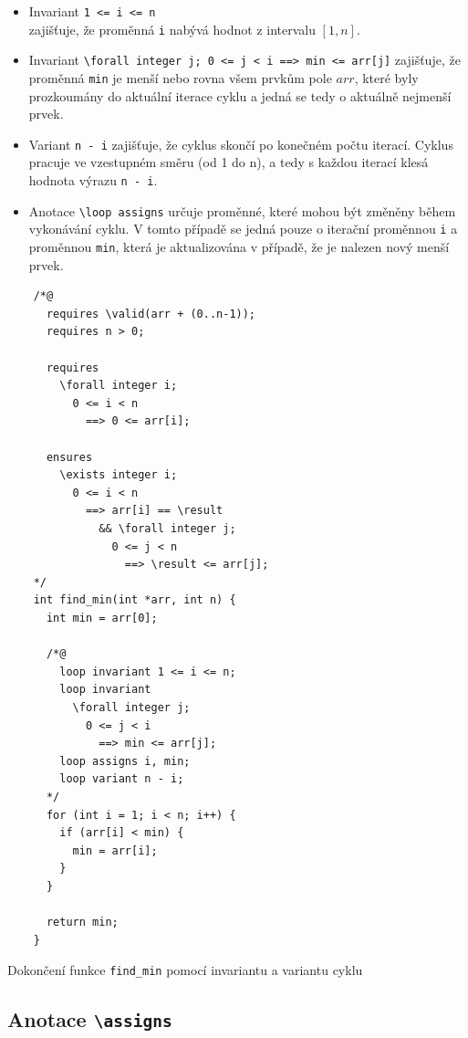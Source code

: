 \begin{itemize}
    \item Invariant \texttt{1 <= i <= n} \\
    zajišťuje, že proměnná \texttt{i} nabývá hodnot z intervalu $[1, n]$.
    \item Invariant \texttt{\textbackslash forall integer j; 0 <= j < i ==> min <= arr[j]}
    zajišťuje, že proměnná \texttt{min} je menší nebo rovna všem prvkům pole $arr$,
    které byly prozkoumány do aktuální iterace cyklu a jedná se tedy o aktuálně nejmenší prvek.
    \item Variant \texttt{n - i} zajišťuje, že cyklus skončí po konečném počtu iterací.
    Cyklus pracuje ve vzestupném směru (od 1 do n),
    a tedy s každou iterací klesá hodnota výrazu \texttt{n - i}.
    \item Anotace \texttt{\textbackslash loop assigns} určuje proměnné, které mohou být změněny během vykonávání cyklu.
    V tomto případě se jedná pouze o iterační proměnnou \texttt{i} a proměnnou \texttt{min},
    která je aktualizována v případě, že je nalezen nový menší prvek.
\end{itemize}

\begin{listing}[H]
    \begin{verbatim}
    /*@
      requires \valid(arr + (0..n-1));
      requires n > 0;

      requires
        \forall integer i;
          0 <= i < n
            ==> 0 <= arr[i];

      ensures
        \exists integer i;
          0 <= i < n
            ==> arr[i] == \result
              && \forall integer j;
                0 <= j < n
                  ==> \result <= arr[j];
    */
    int find_min(int *arr, int n) {
      int min = arr[0];

      /*@
        loop invariant 1 <= i <= n;
        loop invariant
          \forall integer j;
            0 <= j < i
              ==> min <= arr[j];
        loop assigns i, min;
        loop variant n - i;
      */
      for (int i = 1; i < n; i++) {
        if (arr[i] < min) {
          min = arr[i];
        }
      }

      return min;
    }
    \end{verbatim}
    \caption{Dokončení funkce \texttt{find\_min} pomocí invariantu a variantu cyklu}
    \label{list:find-min-complete}
\end{listing}

\subsection{Anotace \texttt{\textbackslash assigns}}
\label{subsec:acsl-anotace-assigns}

